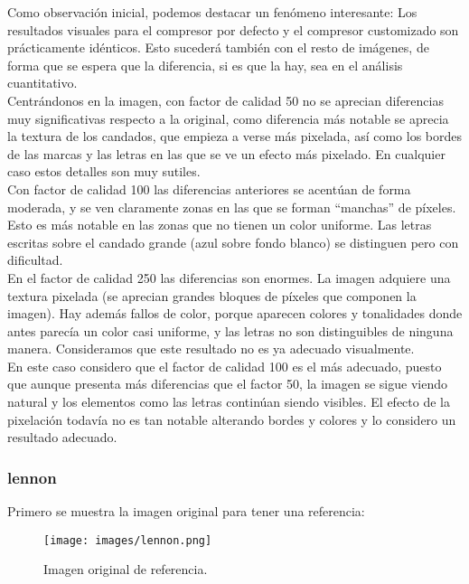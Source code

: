 \documentclass[12pt,a4paper]{article}
\begin{document}
Como observación inicial, podemos destacar un fenómeno interesante: Los resultados visuales para el compresor por defecto y el compresor customizado son prácticamente idénticos. Esto sucederá también con el resto de imágenes, de forma que se espera que la diferencia, si es que la hay, sea en el análisis cuantitativo.\\

Centrándonos en la imagen, con factor de calidad 50 no se aprecian diferencias muy significativas respecto a la original, como diferencia más notable se aprecia la textura de los candados, que empieza a verse más pixelada, así como los bordes de las marcas y las letras en las que se ve un efecto más pixelado. En cualquier caso estos detalles son muy sutiles.\\

Con factor de calidad 100 las diferencias anteriores se acentúan de forma moderada, y se ven claramente zonas en las que se forman ``manchas'' de píxeles. Esto es más notable en las zonas que no tienen un color uniforme. Las letras escritas sobre el candado grande (azul sobre fondo blanco) se distinguen pero con dificultad.\\

En el factor de calidad 250 las diferencias son enormes. La imagen adquiere una textura pixelada (se aprecian grandes bloques de píxeles que componen la imagen). Hay además fallos de color, porque aparecen colores y tonalidades donde antes parecía un color casi uniforme, y las letras no son distinguibles de ninguna manera. Consideramos que este resultado no es ya adecuado visualmente.\\

En este caso considero que el factor de calidad 100 es el más adecuado, puesto que aunque presenta más diferencias que el factor 50, la imagen se sigue viendo natural y los elementos como las letras continúan siendo visibles. El efecto de la pixelación todavía no es tan notable alterando bordes y colores y lo considero un resultado adecuado.\\



\subsubsection{lennon}
Primero se muestra la imagen original para tener una referencia:
\begin{figure}[H]
    \centering
    \texttt{[image: images/lennon.png]}
    \caption[Referencia - lennon]{Imagen original de referencia.}
    
 \end{figure}   
    \vspace{0.5cm}
    
\end{document}
